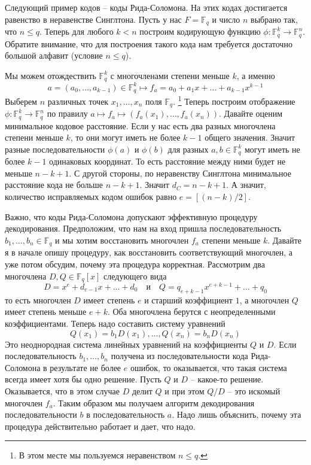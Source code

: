 Следующий пример кодов -- коды Рида-Соломона.
На этих кодах достигается равенство в неравенстве Синглтона.
Пусть у нас $F = \mathbb F_q$ и число $n$ выбрано так, что $n \leqslant q$.
Теперь для любого $k < n$ построим кодирующую функцию $\phi\colon \mathbb F_q^k \to \mathbb F_q^n$.
Обратите внимание, что для построения такого кода нам требуется достаточно большой алфавит (условие $n \leqslant q$).

Мы можем отождествить $\mathbb F_q^k$ с многочленами степени меньше $k$, а именно
\[
a = (a_0,\ldots,a_{k-1})\in \mathbb F_q^k \mapsto f_a = a_0 + a_1 x + \ldots + a_{k-1}x^{k-1}
\]
Выберем $n$ различных точек $x_1,\ldots, x_n$ поля $\mathbb F_q$.%
\footnote{В этом месте мы пользуемся неравенством $n \leqslant q$.}
Теперь построим отображение $\phi \colon \mathbb F_q^k \to \mathbb F_q^n$ по правилу $a \mapsto f_a\mapsto (f_a(x_1),\ldots,f_a(x_n))$.
Давайте оценим минимальное кодовое расстояние.
Если у нас есть два разных многочлена степени меньше $k$, то они могут иметь не более $k-1$ общего значения.
Значит разные последовательности $\phi(a)$ и $\phi(b)$ для разных $a,b\in \mathbb F_q^k$ могут иметь не более $k-1$ одинаковых координат.
То есть расстояние между ними будет не меньше $n - k + 1$.
С другой стороны, по неравенству Синглтона минимальное расстояние кода не больше $n - k + 1$.
Значит $d_C = n - k + 1$.
А значит, количество исправляемых кодом ошибок равно $e = [(n - k)/2]$.

Важно, что коды Рида-Соломона допускают эффективную процедуру декодирования.
Предположим, что нам на вход пришла последовательность $b_1,\ldots, b_n\in \mathbb F_q$ и мы хотим восстановить многочлен $f_a$ степени меньше $k$.
Давайте я в начале опишу процедуру, как восстановить соответствующий многочлен, а уже потом обсудим, почему эта процедура корректная.
Рассмотрим два многочлена $D, Q\in \mathbb F_q[x]$ следующего вида
\[
D = x^e + d_{e-1}x + \ldots + d_0\quad\text{и}\quad
Q = q_{e+k - 1}x^{e+k-1} + \ldots + q_0
\]
то есть многочлен $D$ имеет степень $e$ и старший коэффициент $1$, а многочлен $Q$ имеет степень меньше $e + k$.
Оба многочлена берутся с неопределенными коэффициентами.
Теперь надо составить систему уравнений
\[
Q(x_1) = b_1 D(x_1),\ldots,Q(x_n) = b_n D(x_n)
\]
Это неоднородная система линейных уравнений на коэффициенты $Q$ и $D$.
Если последовательность $b_1,\ldots, b_n$ получена из последовательности кода Рида-Соломона в результате не более $e$ ошибок, то оказывается, что такая система всегда имеет хотя бы одно решение.
Пусть $Q$ и $D$ -- какое-то решение.
Оказывается, что в этом случае $D$ делит $Q$ и при этом $Q/D$ -- это искомый многочлен $f_a$.
Таким образом мы получаем алгоритм декодирования последовательности $b$ в последовательность $a$.
Надо лишь объяснить, почему эта процедура действительно работает и дает, что надо.

